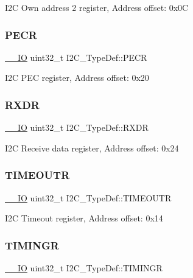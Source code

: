 I2C Own address 2 register, Address offset\+: 0x0C \mbox{\label{struct_i2_c___type_def_a64c9036c1b58778cda97efa2e8a4be97}} 
\subsubsection{\texorpdfstring{PECR}{PECR}}
{\footnotesize\ttfamily \mbox{\hyperlink{core__sc300_8h_aec43007d9998a0a0e01faede4133d6be}{\+\_\+\+\_\+\+IO}} uint32\+\_\+t I2\+C\+\_\+\+Type\+Def\+::\+P\+E\+CR}

I2C P\+EC register, Address offset\+: 0x20 \mbox{\label{struct_i2_c___type_def_a43d30d8efd8e4606663c7cb8d2565e12}} 
\subsubsection{\texorpdfstring{RXDR}{RXDR}}
{\footnotesize\ttfamily \mbox{\hyperlink{core__sc300_8h_aec43007d9998a0a0e01faede4133d6be}{\+\_\+\+\_\+\+IO}} uint32\+\_\+t I2\+C\+\_\+\+Type\+Def\+::\+R\+X\+DR}

I2C Receive data register, Address offset\+: 0x24 \mbox{\label{struct_i2_c___type_def_a95f1607b6254092066a3b6e35146e28a}} 
\subsubsection{\texorpdfstring{TIMEOUTR}{TIMEOUTR}}
{\footnotesize\ttfamily \mbox{\hyperlink{core__sc300_8h_aec43007d9998a0a0e01faede4133d6be}{\+\_\+\+\_\+\+IO}} uint32\+\_\+t I2\+C\+\_\+\+Type\+Def\+::\+T\+I\+M\+E\+O\+U\+TR}

I2C Timeout register, Address offset\+: 0x14 \mbox{\label{struct_i2_c___type_def_a92514ade6721d7c8e35d95c5b5810852}} 
\subsubsection{\texorpdfstring{TIMINGR}{TIMINGR}}
{\footnotesize\ttfamily \mbox{\hyperlink{core__sc300_8h_aec43007d9998a0a0e01faede4133d6be}{\+\_\+\+\_\+\+IO}} uint32\+\_\+t I2\+C\+\_\+\+Type\+Def\+::\+T\+I\+M\+I\+N\+GR}


